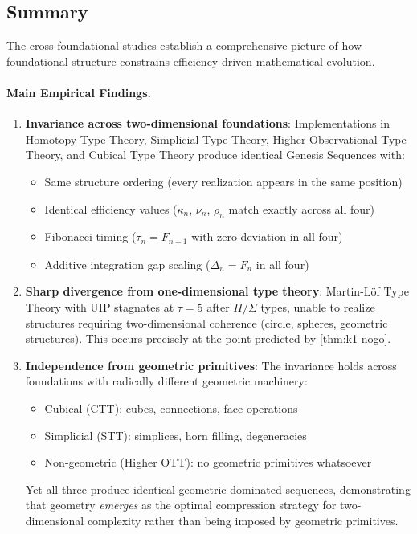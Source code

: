 \documentclass[11pt]{article}
\theoremstyle{definition}
\theoremstyle{remark}
\begin{document}
\subsection{Summary}
\label{subsec:cross-foundational-summary}

The cross-foundational studies establish a comprehensive picture of how foundational structure constrains efficiency-driven mathematical evolution.

\paragraph{Main Empirical Findings.}

\begin{enumerate}
\item \textbf{Invariance across two-dimensional foundations}: Implementations in Homotopy Type Theory, Simplicial Type Theory, Higher Observational Type Theory, and Cubical Type Theory produce identical Genesis Sequences with:
\begin{itemize}
\item Same structure ordering (every realization appears in the same position)
\item Identical efficiency values ($\kappa_n$, $\nu_n$, $\rho_n$ match exactly across all four)
\item Fibonacci timing ($\tau_n = F_{n+1}$ with zero deviation in all four)
\item Additive integration gap scaling ($\Delta_n = F_n$ in all four)
\end{itemize}

\item \textbf{Sharp divergence from one-dimensional type theory}: Martin-Löf Type Theory with UIP stagnates at $\tau = 5$ after $\Pi/\Sigma$ types, unable to realize structures requiring two-dimensional coherence (circle, spheres, geometric structures). This occurs precisely at the point predicted by \cref{thm:k1-nogo}.

\item \textbf{Independence from geometric primitives}: The invariance holds across foundations with radically different geometric machinery:
\begin{itemize}
\item Cubical (CTT): cubes, connections, face operations
\item Simplicial (STT): simplices, horn filling, degeneracies
\item Non-geometric (Higher OTT): no geometric primitives whatsoever
\end{itemize}
Yet all three produce identical geometric-dominated sequences, demonstrating that geometry \emph{emerges} as the optimal compression strategy for two-dimensional complexity rather than being imposed by geometric primitives.


\end{enumerate}
\end{document}
